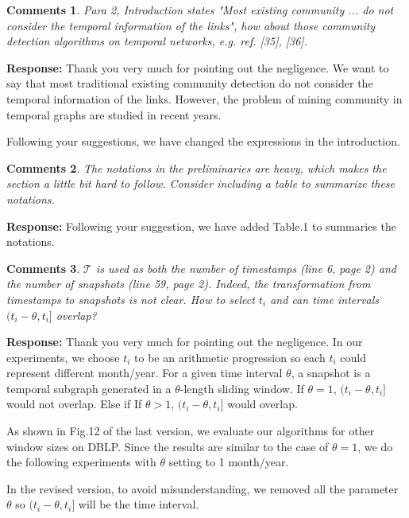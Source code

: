 \documentclass{article}
\newtheorem{Comments}{\textbf{Comments}}
\begin{document}
\begin{Comments}
 Para 2, Introduction states "Most existing community ... do not consider the temporal information of the links", how about those community detection algorithms on temporal networks, e.g. ref. [35], [36].
\end{Comments}
\noindent \textbf{Response: } Thank you very much for pointing out the negligence. We want to say that most traditional existing community detection do not consider the temporal information of the links. However, the problem of mining community in temporal graphs are studied in recent years. 

Following your suggestions, we have changed the expressions in the introduction.


\begin{Comments}
The notations in the preliminaries are heavy, which makes the section a little bit hard to follow. Consider including a table to summarize these notations.
\end{Comments}
\noindent \textbf{Response: } Following your suggestion, we have added Table.1 to summaries the notations.

\begin{Comments}
$\mathcal{T}$ is used as both the number of timestamps (line 6, page 2) and the number of snapshots (line 59, page 2). Indeed, the transformation from timestamps to snapshots is not clear. How to select $t_i$ and can time intervals $(t_i-\theta, t_i]$ overlap?
\end{Comments}
\noindent \textbf{Response: } Thank you very much for pointing out the negligence. In our experiments, we choose $t_i$  to be an arithmetic progression so each $t_i$ could represent different month/year. 
For a given time interval $\theta$, a snapshot is a temporal subgraph generated in a $\theta$-length sliding window. %
If $\theta=1$, $(t_i-\theta, t_i]$ would not overlap. Else if If $\theta>1$, $(t_i-\theta, t_i]$ would overlap. 

As shown in Fig.12 of the last version, we evaluate our algorithms for other window sizes on DBLP. Since the results are similar to the case of $\theta=1$, we do the following experiments with $\theta$ setting to 1 month/year.

In the revised version, to avoid misunderstanding, we removed all the parameter $\theta$ so $(t_i-\theta, t_i]$ will be the time interval.
\end{document}
